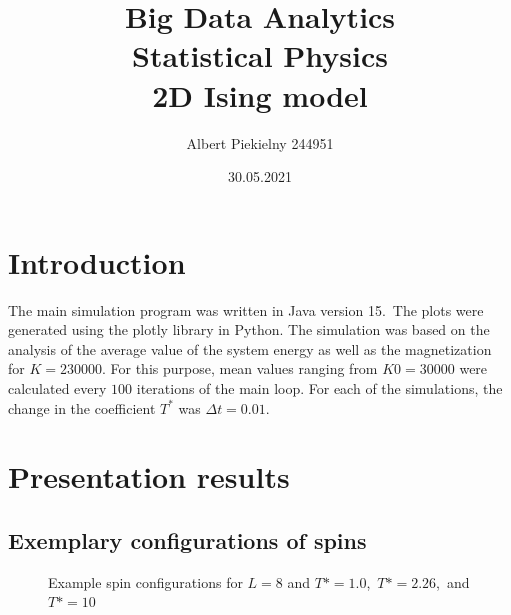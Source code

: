 \documentclass[11pt]{article}
\title{Big Data Analytics\\ Statistical Physics\\ 2D Ising model}
\author{Albert Piekielny 244951\\}
\date{30.05.2021}
\begin{document}
    \maketitle


    \section{Introduction}
    \label{sec:introduction}


    The main simulation program was written in Java version 15.\ The plots were generated using the plotly library in Python.
    The simulation was based on the analysis of the average value of the system energy as well as the magnetization for $K = 230 000$.
    For this purpose, mean values ranging from $K0 = 30 000$ were calculated every $100$ iterations of the main loop.
    For each of the simulations, the change in the coefficient $T^*$ was $\Delta t=0.01$.


    \section{Presentation results}
    \label{sec:results}

    \subsection{Exemplary configurations of spins}
    \label{subsec:exemplary-configurations-of-spins}

    \begin{figure}[H]
        \centering
        \caption{Example spin configurations for $L = 8$ and $T* = 1.0$,\ $T* = 2.26$,\ and $T* = 10$ }
        \label{fig:first}
    \end{figure}
\end{document}
